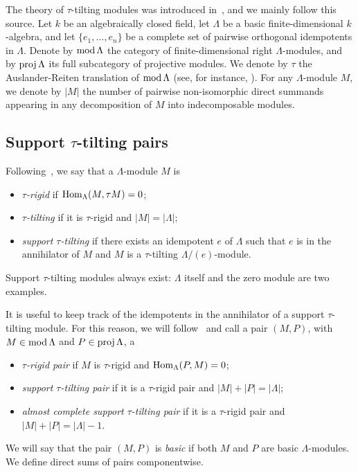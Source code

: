 \documentclass{compositio}
\theoremstyle{definition}
\newcommand{\darkblue}{\color{darkblue}} %
\newcommand{\defn}[1]{\textsl{\darkblue #1}} %
\newcommand{\MOD}{\mbox{{\rm mod \!}}}
\newcommand{\proj}{\operatorname{{\rm proj }}}
\newcommand{\Hom}[1]{\operatorname{{\rm Hom}}_{#1}}
\begin{document}
\enlargethispage{.1cm}
The theory of $\tau$-tilting modules was introduced in~\cite{AdachiIyamaReiten}, and we mainly follow this source.
Let $k$ be an algebraically closed field, let $\Lambda$ be a basic finite-dimensional $k$-algebra, 
and let $\{e_1, \dots, e_n\}$ be a complete set of pairwise orthogonal idempotents in $\Lambda$.
Denote by $\MOD \Lambda$ the category of finite-dimensional right $\Lambda$-modules, 
and by $\proj \Lambda$ its full subcategory of projective modules.
We denote by $\tau$ the Auslander-Reiten translation of $\MOD \Lambda$ (see, for instance, \cite[Chapter IV]{AssemSimsonSkowronski}).
For any $\Lambda$-module $M$, we denote by $|M|$ the number of pairwise non-isomorphic direct summands appearing 
in any decomposition of $M$ into indecomposable modules.


\subsection{Support $\tau$-tilting pairs}

Following~\cite[Def.~0.1]{AdachiIyamaReiten}, we say that a $\Lambda$-module $M$ is 
\begin{itemize}
 \item \defn{$\tau$-rigid} if $\Hom{\Lambda}(M, \tau M) = 0$;
 \item \defn{$\tau$-tilting} if it is $\tau$-rigid and $|M|=|\Lambda|$;
 \item \defn{support $\tau$-tilting} if there exists an idempotent $e$ of $\Lambda$ such that
       $e$ is in the annihilator of $M$ and $M$ is a $\tau$-tilting $\Lambda/(e)$-module.
\end{itemize}
Support $\tau$-tilting modules always exist: $\Lambda$ itself and the zero module are two examples.

It is useful to keep track of the idempotents in the annihilator of a support $\tau$-tilting module.
For this reason, we will follow~\cite[Def.~0.3]{AdachiIyamaReiten} and call a pair $(M,P)$, with $M\in \MOD \Lambda$ and $P\in \proj \Lambda$, a
\begin{itemize}
 \item \defn{$\tau$-rigid pair} if $M$ is $\tau$-rigid and $\Hom{\Lambda}(P,M) = 0$;
 \item \defn{support $\tau$-tilting pair} if it is a $\tau$-rigid pair and $|M| + |P| = |\Lambda|$;
 \item \defn{almost complete support $\tau$-tilting pair} if it is a $\tau$-rigid pair and $|M| + |P| = |\Lambda|-1$.
\end{itemize}
We will say that the pair $(M,P)$ is \defn{basic} if both $M$ and $P$ are basic $\Lambda$-modules.  
We define direct sums of pairs componentwise.
\end{document}
